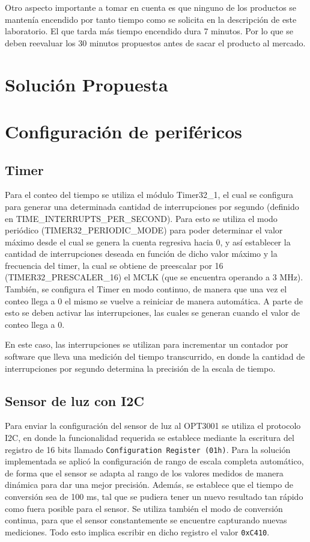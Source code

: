 Otro aspecto importante a tomar en cuenta es que ninguno de los productos se mantenía encendido por
tanto tiempo como se solicita en la descripción de este laboratorio. El que tarda más tiempo
encendido dura 7 minutos. Por lo que se deben reevaluar los 30 minutos propuestos antes de sacar el
producto al mercado.  

\section{Solución Propuesta}

\section{Configuración de periféricos}

\subsection{Timer}
Para el conteo del tiempo se utiliza el módulo Timer32\_1, el cual se configura para generar una
determinada cantidad de interrupciones por segundo (definido en TIME\_INTERRUPTS\_PER\_SECOND). Para
esto se utiliza el modo periódico (TIMER32\_PERIODIC\_MODE) para poder determinar el valor máximo
desde el cual se genera la cuenta regresiva hacia 0, y así establecer la cantidad de interrupciones
deseada en función de dicho valor máximo y la frecuencia del timer, la cual se obtiene de preescalar
por 16 (TIMER32\_PRESCALER\_16) el MCLK (que se encuentra operando a 3 MHz). También, se configura
el Timer en modo continuo, de manera que una vez el conteo llega a 0 el mismo se vuelve a reiniciar
de manera automática. A parte de esto se deben activar las interrupciones, las cuales se generan
cuando el valor de conteo llega a 0.

En este caso, las interrupciones se utilizan para incrementar un contador por software que lleva una
medición del tiempo transcurrido, en donde la cantidad de interrupciones por segundo determina la
precisión de la escala de tiempo.


\subsection{Sensor de luz con I2C}
Para enviar la configuración del sensor de luz al OPT3001 se utiliza el protocolo I2C, en donde la
funcionalidad requerida se establece mediante la escritura del registro de 16 bits llamado
\texttt{Configuration Register (01h)}. Para la solución implementada se aplicó la configuración de
rango de escala completa automático, de forma que el sensor se adapta al rango de los valores
medidos de manera dinámica para dar una mejor precisión. Además, se establece que el tiempo de
conversión sea de 100 ms, tal que se pudiera tener un nuevo resultado tan rápido como fuera posible
para el sensor. Se utiliza también el modo de conversión continua, para que el sensor constantemente
se encuentre capturando nuevas mediciones. Todo esto implica escribir en dicho registro el valor
\texttt{0xC410}.


